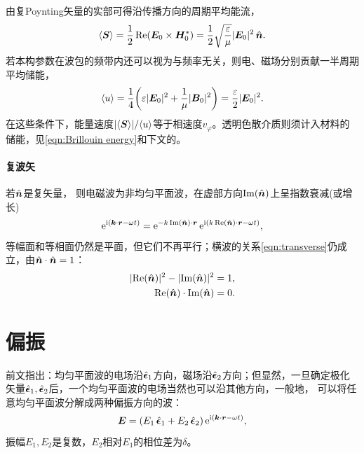 由复Poynting矢量的实部可得沿传播方向的周期平均能流，
\begin{equation}
    \langle\bm S\rangle = \frac12\operatorname{Re}(\bm E_0 \times \bm H_0^\ast)
       = \frac12\sqrt{\frac{\varepsilon}{\mu}}\lvert\bm E_0\rvert^2\mathop{}\!\hat{\bm{n}} .
\end{equation}
若本构参数在波包的频带内还可以视为与频率无关，则电、磁场分别贡献一半周期平均储能，
\begin{equation}
    \langle u\rangle = \frac14\biggl(\varepsilon\lvert\bm E_0\rvert^2 + \frac1\mu\lvert\bm B_0\rvert^2\biggr)
          = \frac{\varepsilon}{2}\lvert\bm E_0\rvert^2 .
\end{equation}
在这些条件下，能量速度$\lvert\langle\bm S\rangle\rvert/\langle u\rangle$等于相速度$v_\varphi$。透明色散介质则须计入材料的储能，见\eqref{eqn:Brillouin energy}和下文的。

\paragraph{复波矢}

若$\mathop{}\!\hat{\bm{n}}$是复矢量，
则电磁波为非均匀平面波，在虚部方向$\operatorname{Im}(\mathop{}\!\hat{\bm{n}})$上呈指数衰减(或增长)
\[
    \mathop{}\!\mathrm{e}^{\mathrm{i}(\bm k\cdot\bm r-\omega t)} = \mathop{}\!\mathrm{e}^{-k\operatorname{Im}(\mathop{}\!\hat{\bm{n}})\cdot\bm r}\mathop{}\!\mathrm{e}^{\mathrm{i}(k\operatorname{Re}(\mathop{}\!\hat{\bm{n}})\cdot\bm r-\omega t)},
\]
等幅面和等相面仍然是平面，但它们不再平行；横波的关系\eqref{eqn:transverse}仍成立，由$\mathop{}\!\hat{\bm{n}} \cdot \mathop{}\!\hat{\bm{n}} = 1$：
\begin{subequations}
    \begin{align}
        \lvert\operatorname{Re}(\mathop{}\!\hat{\bm{n}})\rvert^2 - \lvert\operatorname{Im}(\mathop{}\!\hat{\bm{n}})\rvert^2 &= 1,\\
        \operatorname{Re}(\mathop{}\!\hat{\bm{n}}) \cdot \operatorname{Im}(\mathop{}\!\hat{\bm{n}}) &= 0.
    \end{align}
\end{subequations}

\section{偏振}

前文指出：均匀平面波的电场沿$\mathop{}\!\hat{\bm{\epsilon}}_1$方向，磁场沿$\mathop{}\!\hat{\bm{\epsilon}}_2$方向；但显然，一旦确定极化矢量$\mathop{}\!\hat{\bm{\epsilon}}_1,\mathop{}\!\hat{\bm{\epsilon}}_2$后，一个均匀平面波的电场当然也可以沿其他方向，一般地，
可以将任意均匀平面波分解成两种偏振方向的波：
\[
    \bm E = (E_1\mathop{}\!\hat{\bm{\epsilon}}_1 + E_2\mathop{}\!\hat{\bm{\epsilon}}_2)\mathop{}\!\mathrm{e}^{\mathrm{i}(\bm k\cdot\bm r-\omega t)},
\]
振幅$E_1,E_2$是复数，$E_2$相对$E_1$的相位差为$\delta$。

